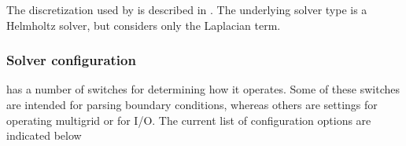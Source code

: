 \documentclass[letterpaper,10pt,english]{sphinxmanual}
\begin{document}
\sphinxAtStartPar
The discretization used by  is described in {\hyperref[\detokenize{Source/LinearSolvers:chap-linearsolvers}]{}}.
The underlying solver type is a Helmholtz solver, but  considers only the Laplacian term.


\subsubsection{Solver configuration}
\label{\detokenize{Solvers/Electrostatics:solver-configuration}}
\sphinxAtStartPar
{} has a number of switches for determining how it operates.
Some of these switches are intended for parsing boundary conditions, whereas others are settings for operating multigrid or for I/O.
The current list of configuration options are indicated below
\end{document}

